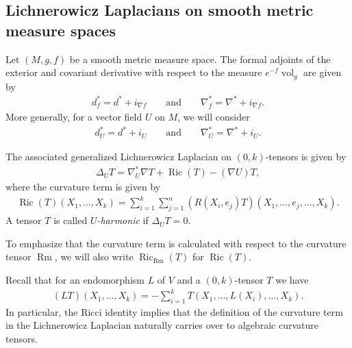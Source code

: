 \documentclass[10pt,a4paper]{amsart}
\numberwithin{equation}{section}
\newcommand{\vol}{\operatorname{vol}}
\newcommand{\Ric} {\operatorname{Ric}}
\newcommand{\Rm} {\operatorname{Rm}}
\begin{document}
\subsection{Lichnerowicz Laplacians on smooth metric measure spaces}
Let $(M,g,f)$ be a smooth metric measure space. The formal adjoints of the exterior and covariant derivative with respect to the measure $e^{-f} \vol_g$ are given by
\begin{gather*}
d^{*}_f = d^{*} + i_{\nabla f} \qquad \text{and} \qquad \nabla^{*}_f = \nabla^{*} + i_{\nabla f}.
\end{gather*}
More generally, for a vector field $U$ on $M$, we will consider
\begin{gather*}
d^{*}_U = d^{*} + i_{U} \qquad \text{and} \qquad \nabla^{*}_U = \nabla^{*} + i_{U}.
\end{gather*}

The associated generalized Lichnerowicz Laplacian on $(0,k)$-tensors is given by
\begin{gather*}
\Delta_U T = \nabla^{*}_U \nabla T + \Ric(T) - (\nabla U) T,
\end{gather*}
where the curvature term is given by
\begin{gather*}
\Ric(T)(X_1, \dots, X_k) = \sum_{i=1}^k \sum_{j=1}^n (R(X_i,e_j)T) (X_1, \dots, e_j, \dots, X_k).
\end{gather*}
A tensor $T$ is called {\em $U$-harmonic} if $\Delta_U T =0$.

To emphasize that the curvature term is calculated with respect to the curvature tensor $\Rm$, we will also write $\Ric_{\Rm}(T)$ for $\Ric(T)$.

Recall that for an endomorphism $L$ of $V$ and a $(0,k)$-tensor $T$ we have
\begin{gather*}
(LT)(X_1, \dots, X_k) = - \sum_{i=1}^k T(X_1, \dots,L(X_i), \dots, X_k).
\end{gather*}
In particular, the Ricci identity implies that the definition of the curvature term in the Lichnerowicz Laplacian naturally carries over to algebraic curvature tensors.
\end{document}
